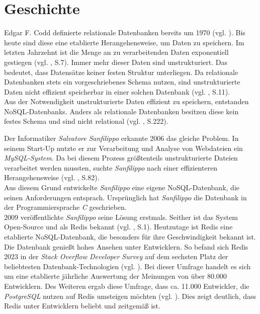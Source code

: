 
\section{Geschichte}
\label{Geschichte}
Edgar F. Codd definierte relationale Datenbanken bereits um 1970 (vgl. \cite{codd}). Bis heute sind diese eine etablierte Herangehensweise, um Daten zu speichern. Im letzten Jahrzehnt ist die Menge an zu verarbeitenden Daten exponentiell gestiegen (vgl. \cite{nosql}, S.7). Immer mehr dieser Daten sind unstrukturiert. Das bedeutet, dass Datensätze keiner festen Struktur unterliegen. Da relationale Datenbanken stets ein vorgeschriebenes Schema nutzen, sind unstrukturierte Daten nicht effizient speicherbar in einer solchen Datenbank (vgl. \cite{2016sql}, S.11). 
\\Aus der Notwendigkeit unstrukturierte Daten effizient zu speichern, entstanden \acp{NoSQL-Datenbank}. Anders als relationale Datenbanken besitzen diese kein festes Schema und sind nicht relational (vgl. \cite{2016sql}, S.222).

Der Informatiker \textit{Salvatore Sanfilippo} erkannte 2006 das gleiche Problem. In seinem Start-Up nutzte er zur Verarbeitung und Analyse von Webdateien ein\textit{ MySQL-System}. Da bei diesem Prozess größtenteils unstrukturierte Dateien verarbeitet werden mussten, suchte \textit{Sanfilippo} nach einer effizienteren Herangehensweise (vgl. \cite{nosql}, S.82).
\\Aus diesem Grund entwickelte \textit{Sanfilippo} eine eigene \acs{NoSQL-Datenbank}, die seinen Anforderungen entsprach. Ursprünglich hat \textit{Sanfilippo} die Datenbank in der Programmiersprache \textit{C} geschrieben.
\\2009 veröffentlichte \textit{Sanfilippo} seine Lösung erstmals. Seither ist das System Open-Source und als \acs{Redis} bekannt (vgl. \cite{learningRedis}, S.1). Heutzutage ist \acs{Redis} eine etablierte \acs{NoSQL-Datenbank}, die besonders für ihre Geschwindigkeit bekannt ist. Die Datenbank genießt hohes Ansehen unter Entwicklern. So befand sich \acs{Redis} 2023 in der \textit{Stack Overflow Developer Survey} auf dem sechsten Platz der beliebtesten Datenbank-Technologien (vgl. \cite{stackOver}). Bei dieser Umfrage handelt es sich um eine etablierte jährliche Auswertung der Meinungen von über 80.000 Entwicklern. Des Weiteren ergab diese Umfrage, dass ca. 11.000 Entwickler, die \textit{PostgreSQL} nutzen auf \acs{Redis} umsteigen möchten (vgl. \cite{stackOver}). Dies zeigt deutlich, dass \acs{Redis} unter Entwicklern beliebt und zeitgemäß ist. 